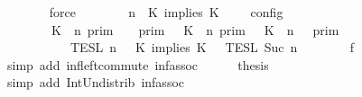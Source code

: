 \begin{isabellebody}
\ \ \ \ \ \ \isamarkupfalse%
\ force\isanewline
\ \ \ \ \isamarkupfalse%
\ {\isacartoucheopen}{\isasymlbrakk}\ {\isasymGamma}{\isacharcomma}\ n\ {\isasymturnstile}\ {\isacharparenleft}{\isacharparenleft}K\ implies\ K\ {\isacharhash}\ {\isasymPsi}{\isacharparenright}\ {\isasymtriangleright}\ {\isasymPhi}\ {\isasymrbrakk}\isactrlsub c\isactrlsub o\isactrlsub n\isactrlsub f\isactrlsub i\isactrlsub g\isanewline
\ \ \ \ \ \ {\isacharequal}\ {\isacharparenleft}{\isasymlbrakk}\ K\ {\isasymnot}{\isasymUp}\ n\ {\isasymrbrakk}\isactrlsub p\isactrlsub r\isactrlsub i\isactrlsub m\ {\isasyminter}\ {\isasymlbrakk}{\isasymlbrakk}\ {\isasymGamma}\ {\isasymrbrakk}{\isasymrbrakk}\isactrlsub p\isactrlsub r\isactrlsub i\isactrlsub m\ {\isasymunion}\ {\isasymlbrakk}\ K\ {\isasymUp}\ n\ {\isasymrbrakk}\isactrlsub p\isactrlsub r\isactrlsub i\isactrlsub m\ {\isasyminter}\ {\isasymlbrakk}{\isasymlbrakk}\ {\isacharparenleft}K\ {\isasymUp}\ n{\isacharparenright}\ {\isacharhash}\ {\isasymGamma}\ {\isasymrbrakk}{\isasymrbrakk}\isactrlsub p\isactrlsub r\isactrlsub i\isactrlsub m{\isacharparenright}\isanewline
\ \ \ \ \ \ \ \ {\isasyminter}\ {\isacharparenleft}{\isasymlbrakk}{\isasymlbrakk}\ {\isasymPsi}\ {\isasymrbrakk}{\isasymrbrakk}\isactrlsub T\isactrlsub E\isactrlsub S\isactrlsub L\isactrlbsup {\isasymge}\ n\isactrlesup \ {\isasyminter}\ {\isasymlbrakk}{\isasymlbrakk}\ {\isacharparenleft}K\ implies\ K\ {\isacharhash}\ {\isasymPhi}\ {\isasymrbrakk}{\isasymrbrakk}\isactrlsub T\isactrlsub E\isactrlsub S\isactrlsub L\isactrlbsup {\isasymge}\ Suc\ n\isactrlesup {\isacharparenright}{\isacartoucheclose}\isanewline
\ \ \ \ \ \ \isamarkupfalse%
\ f{}\ \isamarkupfalse%
\ {\isacharparenleft}simp\ add{\isacharcolon}\ inf{\isacharunderscore}left{\isacharunderscore}commute\ inf{\isacharunderscore}assoc{\isacharparenright}\isanewline
\ \ \ \ \isamarkupfalse%
\ {\isacharquery}thesis\ \isamarkupfalse%
\ {\isacharparenleft}simp\ add{\isacharcolon}\ Int{\isacharunderscore}Un{\isacharunderscore}distrib{}\ inf{\isacharunderscore}assoc{\isacharparenright}\isanewline
\ \ \isamarkupfalse%
\isanewline
{}\isamarkupfalse%
%
\endisatagproof
{\isafoldproof}%
%
\isadelimproof
\isanewline
%
\endisadelimproof
\isanewline
{}\isamarkupfalse%

\end{isabellebody}
